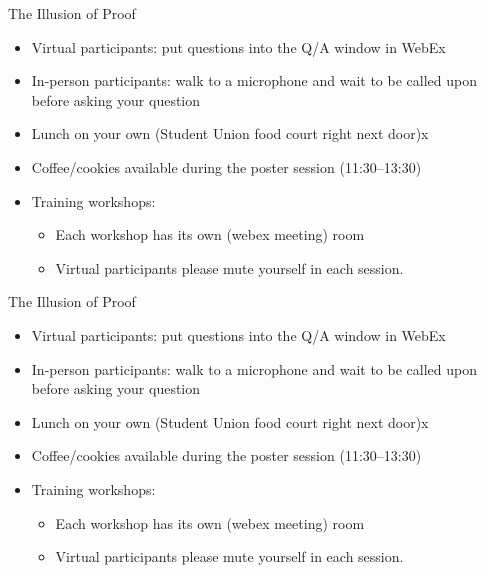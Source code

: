 \documentclass[aspectratio=169, 12pt]{beamer}
\begin{document}
\begin{frame}{The Illusion of Proof}
  \begin{itemize}
  \item Virtual participants: put questions into the Q/A window in WebEx
  \item In-person participants: walk to a microphone and wait to be called upon
    before asking your question
  \item Lunch on your own (Student Union food court right next door)x
  \item Coffee/cookies available during the poster session (11:30--13:30)
  \item Training workshops:
    \begin{itemize}
    \item Each workshop has its own (webex meeting) room
    \item Virtual participants please mute yourself in each session.
    \end{itemize}
  \end{itemize}
\end{frame}

\begin{frame}{The Illusion of Proof}
  \begin{itemize}
  \item Virtual participants: put questions into the Q/A window in WebEx
  \item In-person participants: walk to a microphone and wait to be called upon
    before asking your question
  \item Lunch on your own (Student Union food court right next door)x
  \item Coffee/cookies available during the poster session (11:30--13:30)
  \item Training workshops:
    \begin{itemize}
    \item Each workshop has its own (webex meeting) room
    \item Virtual participants please mute yourself in each session.
    \end{itemize}
  \end{itemize}
\end{frame}
\end{document}
